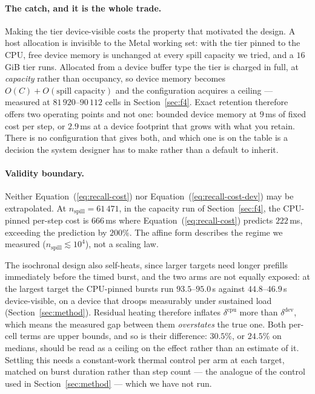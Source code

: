 \documentclass[manuscript,anonymous,review]{acmart}
\begin{document}
\paragraph{The catch, and it is the whole trade.} Making the tier
device-visible costs the property that motivated the design. A host
allocation is invisible to the Metal working set: with the tier pinned
to the CPU, free device memory is unchanged at every spill capacity we
tried, and a $16$\,GiB tier runs. Allocated from a device buffer type
the tier is charged in full, at \emph{capacity} rather than occupancy,
so device memory becomes $O(C) + O(\text{spill capacity})$ and the
configuration acquires a ceiling --- measured at $81\,920$--$90\,112$
cells in Section~\ref{sec:f4}. Exact retention therefore offers two
operating points and not one: bounded device memory at $9$\,ms of
fixed cost per step, or $2.9$\,ms at a device footprint that grows with
what you retain. There is no configuration that gives both, and which
one is on the table is a decision the system designer has to make
rather than a default to inherit.

\paragraph{Validity boundary.} Neither
Equation~(\ref{eq:recall-cost}) nor
Equation~(\ref{eq:recall-cost-dev}) may be extrapolated. At
$n_\text{spill} = 61\,471$, in the capacity run of
Section~\ref{sec:f4}, the CPU-pinned per-step cost is $666$\,ms where
Equation~(\ref{eq:recall-cost}) predicts $222$\,ms, exceeding the
prediction by $200\%$. The affine
form describes the regime we measured ($n_\text{spill} \lesssim 10^4$),
not a scaling law.

The isochronal design also self-heats, since larger targets need longer
prefills immediately before the timed burst, and the two arms are not
equally exposed: at the largest target the CPU-pinned bursts run
$93.5$--$95.0$\,s against $44.8$--$46.9$\,s device-visible, on a device
that droops measurably under sustained load
(Section~\ref{sec:method}). Residual heating therefore inflates
$\delta^{\text{cpu}}$ more than $\delta^{\text{dev}}$, which means the
measured gap between them \emph{overstates} the true one. Both per-cell
terms are upper bounds, and so is their difference: $30.5\%$, or
$24.5\%$ on medians, should be read as a ceiling on the effect rather
than an estimate of it. Settling this needs a constant-work thermal
control per arm at each target, matched on burst duration rather than
step count --- the analogue of the control used in
Section~\ref{sec:method} --- which we have not run.
\end{document}
